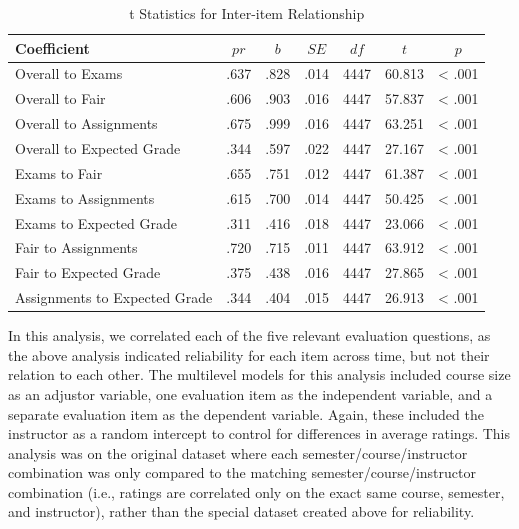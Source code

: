 \documentclass[man]{apa6}
\theoremstyle{definition}
\theoremstyle{definition}
\theoremstyle{definition}
\theoremstyle{remark}
\begin{document}
\begin{table}[tbp]
\begin{center}
\begin{threeparttable}
\caption{\label{tab:correlation-table}t Statistics for Inter-item Relationship}
\begin{tabular}{lcccccc}
\toprule
Coefficient & $pr$ & $b$ & $SE$ & $df$ & $t$ & $p$\\
\midrule
Overall to Exams & .637 & .828 & .014 & 4447 & 60.813 & < .001\\
Overall to Fair & .606 & .903 & .016 & 4447 & 57.837 & < .001\\
Overall to Assignments & .675 & .999 & .016 & 4447 & 63.251 & < .001\\
Overall to Expected Grade & .344 & .597 & .022 & 4447 & 27.167 & < .001\\
Exams to Fair & .655 & .751 & .012 & 4447 & 61.387 & < .001\\
Exams to Assignments & .615 & .700 & .014 & 4447 & 50.425 & < .001\\
Exams to Expected Grade & .311 & .416 & .018 & 4447 & 23.066 & < .001\\
Fair to Assignments & .720 & .715 & .011 & 4447 & 63.912 & < .001\\
Fair to Expected Grade & .375 & .438 & .016 & 4447 & 27.865 & < .001\\
Assignments to Expected Grade & .344 & .404 & .015 & 4447 & 26.913 & < .001\\
\bottomrule
\end{tabular}
\end{threeparttable}
\end{center}
\end{table}

In this analysis, we correlated each of the five relevant evaluation questions, as the above analysis indicated reliability for each item across time, but not their relation to each other. The multilevel models for this analysis included course size as an adjustor variable, one evaluation item as the independent variable, and a separate evaluation item as the dependent variable. Again, these included the instructor as a random intercept to control for differences in average ratings. This analysis was on the original dataset where each semester/course/instructor combination was only compared to the matching semester/course/instructor combination (i.e., ratings are correlated only on the exact same course, semester, and instructor), rather than the special dataset created above for reliability.
\end{document}
